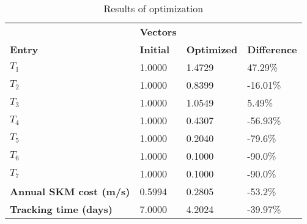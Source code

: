 \begin{table}[H]
\centering
\begin{tabular}{llll}
\textbf{}      & \cellcolor[HTML]{EFEFEF}\textbf{Vectors} & \textbf{} & \textbf{}         \\
\rowcolor[HTML]{EFEFEF} 
\textbf{Entry} & \textbf{Initial} & \textbf{Optimized} & \textbf{Difference} \\
$T_1$ & 1.0000 & 1.4729 & 47.29\% \\ 
$T_2$ & 1.0000 & 0.8399 & -16.01\% \\ 
$T_3$ & 1.0000 & 1.0549 & 5.49\% \\ 
$T_4$ & 1.0000 & 0.4307 & -56.93\% \\ 
$T_5$ & 1.0000 & 0.2040 & -79.6\% \\ 
$T_6$ & 1.0000 & 0.1000 & -90.0\% \\ 
$T_7$ & 1.0000 & 0.1000 & -90.0\% \\ 
\rowcolor[HTML]{EFEFEF} 
\textbf{Annual SKM cost (m/s)}  & 0.5994 & 0.2805 & -53.2\% \\ 
\rowcolor[HTML]{EFEFEF} 
\textbf{Tracking time (days)}  & 7.0000 & 4.2024 & -39.97\% \\ 
\end{tabular}
\caption{Results of optimization}
\label{tab:OptimizationAnalysis}
\end{table}